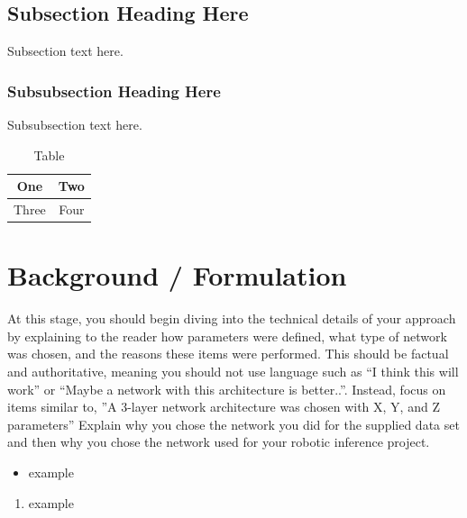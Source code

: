 \documentclass[10pt,journal,compsoc]{IEEEtran}
\begin{document}
\subsection{Subsection Heading Here}
Subsection text here.

\subsubsection{Subsubsection Heading Here}
Subsubsection text here.


\begin{table}[h]
\caption{Table}
\label{table_example}
\begin{center}
\begin{tabular}{|c||c|}
\hline
One & Two\\
\hline
Three & Four\\
\hline
\end{tabular}
\end{center}
\end{table}



   

\section{Background / Formulation}
At this stage, you should begin diving into the technical details of your approach by explaining to the reader how parameters were defined, what type of network was chosen, and the reasons these items were performed. This should be factual and authoritative, meaning you should not use language such as “I think this will work” or “Maybe a network with this architecture is better..”. Instead, focus on items similar to, ”A 3-layer network architecture was chosen with X, Y, and Z parameters” 
Explain why you chose the network you did for the supplied data set and then why you chose the network used for your robotic inference project. \cite{lamport1994latex}


\begin{itemize}
\item example
\end {itemize}



\begin{enumerate}
\item example

\end{enumerate}
\end{document}
